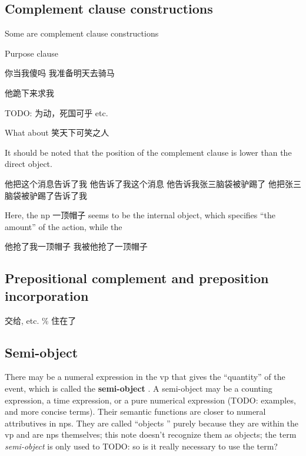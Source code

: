 \documentclass[UTF8, a4paper, oneside, scheme=plain, 12pt]{ctexrep}
\newcommand*{\citesec}[1]{\S~{#1}}
\newcommand*{\concept}[1]{\textbf{#1}}
\newcommand*{\term}[1]{\emph{#1}}
\begin{document}
\subsection{Complement clause constructions}

Some are complement clause constructions

Purpose clause

\begin{exe}
    \ex 你当我傻吗
    \ex 我准备明天去骑马
\end{exe}

\begin{exe}
    \ex 他跪下来求我
\end{exe}

TODO: 为动，死国可乎 etc.

What about 笑天下可笑之人

It should be noted that the position of the complement clause
is lower than the direct object.

\begin{exe}
    \ex 他把这个消息告诉了我
    \ex 他告诉了我这个消息
    \ex 他告诉我张三脑袋被驴踢了
    \ex *他把张三脑袋被驴踢了告诉了我
\end{exe}

Here, the \acs{np} 一顶帽子 seems to be the internal object, 
which specifies ``the amount'' of the action,
while the 

\begin{exe}
    \ex 他抢了我一顶帽子
    \ex 我被他抢了一顶帽子
\end{exe}

\subsection{Prepositional complement and preposition incorporation}\label{sec:verb-phrase.internal.preposition}

交给, etc. \% 住在了

\subsection{Semi-object}\label{sec:vp.internal.semi-object}

There may be a numeral expression in the \acs{vp}
that gives the ``quantity'' of the event, 
which is called the \concept{semi-object} 
\citep[\citesec{8.6}]{zhudexigrammar}.
A semi-object may be a counting expression, 
a time expression, 
or a pure numerical expression (TODO: examples, and more concise terms).
Their semantic functions 
are closer to numeral attributives in \acs{np}s.
They are called ``objects '' purely because they are within the \acs{vp}
and are \acs{np}s themselves;
this note doesn't recognize them as objects;
the term \term{semi-object} is only used to TODO: so is it really necessary to use the term?
\end{document}
